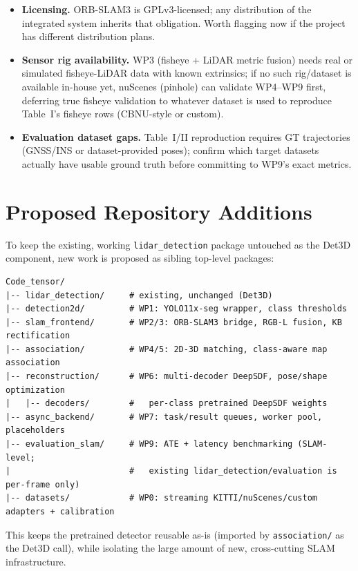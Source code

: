 \documentclass[11pt]{article}
\begin{document}
\begin{itemize}
  \item \textbf{Licensing.} ORB-SLAM3 is GPLv3-licensed; any distribution of the integrated system inherits that obligation. Worth flagging now if the project has different distribution plans.
  \item \textbf{Sensor rig availability.} WP3 (fisheye + LiDAR metric fusion) needs real or simulated fisheye-LiDAR data with known extrinsics; if no such rig/dataset is available in-house yet, nuScenes (pinhole) can validate WP4--WP9 first, deferring true fisheye validation to whatever dataset is used to reproduce Table~I's fisheye rows (CBNU-style or custom).
  \item \textbf{Evaluation dataset gaps.} Table~I/II reproduction requires GT trajectories (GNSS/INS or dataset-provided poses); confirm which target datasets actually have usable ground truth before committing to WP9's exact metrics.
\end{itemize}

\section{Proposed Repository Additions}

To keep the existing, working \texttt{lidar\_detection} package untouched as the Det3D component, new work is proposed as sibling top-level packages:

\small
\begin{verbatim}
Code_tensor/
|-- lidar_detection/     # existing, unchanged (Det3D)
|-- detection2d/         # WP1: YOLO11x-seg wrapper, class thresholds
|-- slam_frontend/       # WP2/3: ORB-SLAM3 bridge, RGB-L fusion, KB rectification
|-- association/         # WP4/5: 2D-3D matching, class-aware map association
|-- reconstruction/      # WP6: multi-decoder DeepSDF, pose/shape optimization
|   |-- decoders/        #   per-class pretrained DeepSDF weights
|-- async_backend/       # WP7: task/result queues, worker pool, placeholders
|-- evaluation_slam/     # WP9: ATE + latency benchmarking (SLAM-level;
|                        #   existing lidar_detection/evaluation is per-frame only)
|-- datasets/            # WP0: streaming KITTI/nuScenes/custom adapters + calibration
\end{verbatim}
\normalsize

This keeps the pretrained detector reusable as-is (imported by \texttt{association/} as the Det3D call), while isolating the large amount of new, cross-cutting SLAM infrastructure.
\end{document}
